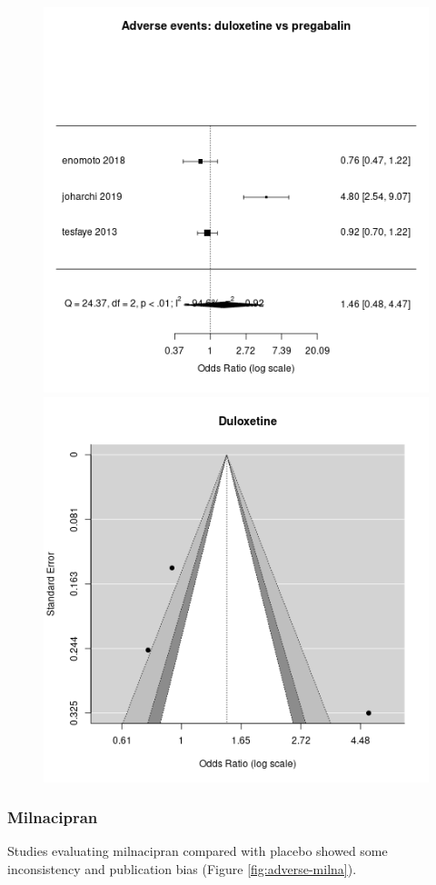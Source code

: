 \documentclass{report}\usepackage[]{graphicx}\usepackage[]{color}
\newenvironment{knitrout}{}{} %
\begin{document}
\begin{figure}
\begin{knitrout}
\color{fgcolor}
\includegraphics[width=0.5\linewidth,height=0.35\textheight]{img/adverse-duloxetine-pregabalin-forest} 
\includegraphics[width=0.5\linewidth,height=0.35\textheight]{img/adverse-duloxetine-pregabalin-funnel} 
\end{knitrout}

\caption[Adverse: duloxetine vs pregabalin]{}
\label{fig:adverse-dulox-pregab}
\end{figure}


\subsubsection{Milnacipran}

Studies evaluating milnacipran compared with placebo showed some inconsistency and publication bias (Figure \ref{fig:adverse-milna}).
\end{document}
